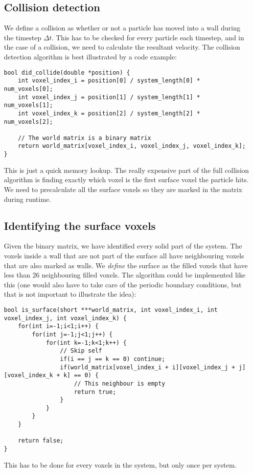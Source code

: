 \subsection{Collision detection}
We define a collision as whether or not a particle has moved into a wall during the timestep $\Delta t$. This has to be checked for every particle each timestep, and in the case of a collision, we need to calculate the resultant velocity. The collision detection algorithm is best illustrated by a code example:
\begin{lstlisting}
bool did_collide(double *position) {
	int voxel_index_i = position[0] / system_length[0] * num_voxels[0];
	int voxel_index_j = position[1] / system_length[1] * num_voxels[1];
	int voxel_index_k = position[2] / system_length[2] * num_voxels[2];

	// The world matrix is a binary matrix
	return world_matrix[voxel_index_i, voxel_index_j, voxel_index_k];
}
\end{lstlisting}
This is just a quick memory lookup. The really expensive part of the full collision algorithm is finding exactly which voxel is the first surface voxel the particle hits. We need to precalculate all the surface voxels so they are marked in the matrix during runtime.
\subsection{Identifying the surface voxels}
Given the binary matrix, we have identified every solid part of the system. The voxels inside a wall that are not part of the surface all have neighbouring voxels that are also marked as walls. We \textit{define} the surface as the filled voxels that have less than 26 neighbouring filled voxels. The algorithm could be implemented like this (one would also have to take care of the periodic boundary conditions, but that is not important to illustrate the idea):
\begin{lstlisting}
bool is_surface(short ***world_matrix, int voxel_index_i, int voxel_index_j, int voxel_index_k) {
	for(int i=-1;i<1;i++) {
    	for(int j=-1;j<1;j++) {
			for(int k=-1;k<1;k++) {
				// Skip self
				if(i == j == k == 0) continue; 
                if(world_matrix[voxel_index_i + i][voxel_index_j + j][voxel_index_k + k] == 0) {
                	// This neighbour is empty
                	return true;
                }
            }
        }
    }

    return false;
}
\end{lstlisting}
This has to be done for every voxels in the system, but only once per system.

